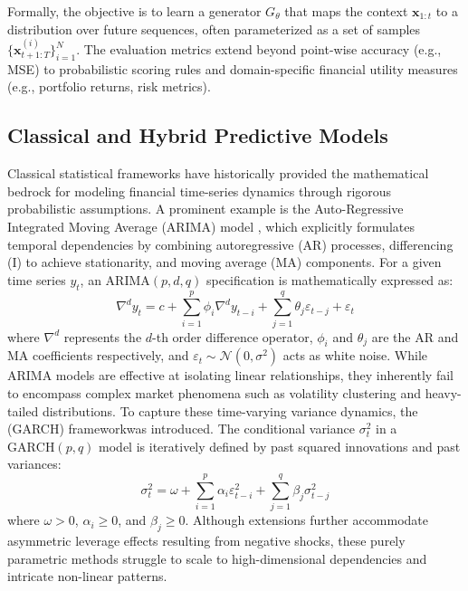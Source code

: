 Formally, the objective is to learn a generator $G_\theta$ that maps the context $\mathbf{x}_{1:t}$ to a distribution over future sequences, often parameterized as a set of samples $\{\mathbf{x}_{t+1:T}^{(i)}\}_{i=1}^N$. The evaluation metrics extend beyond point-wise accuracy (e.g., MSE) to probabilistic scoring rules and domain-specific financial utility measures (e.g., portfolio returns, risk metrics).

\subsection{Classical and Hybrid Predictive Models}

Classical statistical frameworks have historically provided the mathematical bedrock for modeling financial time-series dynamics through rigorous probabilistic assumptions. A prominent example is the Auto-Regressive Integrated Moving Average (ARIMA) model \citep{box1970}, which explicitly formulates temporal dependencies by combining autoregressive (AR) processes, differencing (I) to achieve stationarity, and moving average (MA) components. For a given time series $y_t$, an $\text{ARIMA}(p, d, q)$ specification is mathematically expressed as:
\begin{equation}
\nabla^d y_t = c + \sum_{i=1}^p \phi_i \nabla^d y_{t-i} + \sum_{j=1}^q \theta_j \varepsilon_{t-j} + \varepsilon_t
\end{equation}
where $\nabla^d$ represents the $d$-th order difference operator, $\phi_i$ and $\theta_j$ are the AR and MA coefficients respectively, and $\varepsilon_t \sim \mathcal{N}(0, \sigma^2)$ acts as white noise. While ARIMA models are effective at isolating linear relationships, they inherently fail to encompass complex market phenomena such as volatility clustering and heavy-tailed distributions. To capture these time-varying variance dynamics, the (GARCH) frameworkwas introduced. The conditional variance $\sigma_t^2$ in a $\text{GARCH}(p, q)$ model is iteratively defined by past squared innovations and past variances:
\begin{equation}
\sigma_t^2 = \omega + \sum_{i=1}^p \alpha_i \varepsilon_{t-i}^2 + \sum_{j=1}^q \beta_j \sigma_{t-j}^2
\end{equation}
where $\omega > 0$, $\alpha_i \ge 0$, and $\beta_j \ge 0$. Although extensions further accommodate asymmetric leverage effects resulting from negative shocks, these purely parametric methods struggle to scale to high-dimensional dependencies and intricate non-linear patterns.

